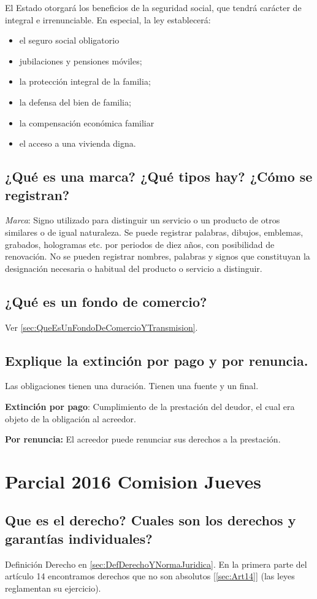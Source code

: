 \documentclass{article}
\begin{document}
El Estado otorgará los beneficios de la seguridad social, que tendrá carácter de integral e irrenunciable. En especial, la ley establecerá: 

\begin{itemize}
\item el seguro social obligatorio 
\item jubilaciones y pensiones móviles;
\item la protección integral de la familia; 
\item la defensa del bien de familia; 
\item la compensación económica familiar
\item el acceso a una vivienda digna.
\end{itemize}


\subsection{¿Qué es una marca? ¿Qué tipos hay? ¿Cómo se registran?}
\textit{Marca}: Signo utilizado para distinguir un servicio o un producto de otros similares o de igual naturaleza. Se puede registrar palabras, dibujos, emblemas, grabados, hologramas etc. por periodos de diez años, con posibilidad de renovación. 
	No se pueden registrar nombres, palabras y signos que constituyan la designación necesaria o habitual del producto o servicio a distinguir.

\subsection{¿Qué es un fondo de comercio?}
Ver \ref{sec:QueEsUnFondoDeComercioYTransmision}.
\subsection{Explique la extinción por pago y por renuncia.}
Las obligaciones tienen una duración. Tienen una fuente y un final. 

\textbf{Extinción por pago}: Cumplimiento de la prestación del deudor, el cual era objeto de la obligación al acreedor.

\textbf{Por renuncia:} El acreedor puede renunciar sus derechos a la prestación.


\section{Parcial 2016 Comision Jueves}
\subsection{Que es el derecho? Cuales son los derechos y garantías individuales?}
Definición Derecho en \ref{sec:DefDerechoYNormaJuridica}. En la primera parte del artículo 14 encontramos derechos que no son absolutos [\ref{sec:Art14}] (las leyes reglamentan su ejercicio).
\end{document}

